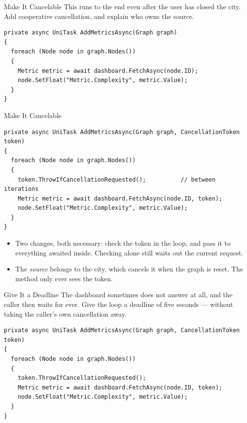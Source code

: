 \begin{exerciseframe}{Make It Cancelable}
  This runs to the end even after the user has closed the city. Add
  cooperative cancellation, and explain who owns the source.
  \vspace{1ex}

  \begin{lstlisting}[basicstyle=\scriptsize\ttfamily]
private async UniTask AddMetricsAsync(Graph graph)
{
  foreach (Node node in graph.Nodes())
  {
    Metric metric = await dashboard.FetchAsync(node.ID);
    node.SetFloat("Metric.Complexity", metric.Value);
  }
}
  \end{lstlisting}
\end{exerciseframe}

\begin{solutionframe}{Make It Cancelable}
  \begin{lstlisting}[basicstyle=\scriptsize\ttfamily]
private async UniTask AddMetricsAsync(Graph graph, CancellationToken token)
{
  foreach (Node node in graph.Nodes())
  {
    token.ThrowIfCancellationRequested();          // between iterations
    Metric metric = await dashboard.FetchAsync(node.ID, token);
    node.SetFloat("Metric.Complexity", metric.Value);
  }
}
  \end{lstlisting}
  \vspace{1ex}

  \begin{itemize}
    \item Two changes, both necessary: check the token in the loop, and pass
      it to everything awaited inside. Checking alone still waits out the
      current request.
    \item The \emph{source} belongs to the city, which cancels it when the
      graph is reset. The method only ever sees the token.
  \end{itemize}
  \vspace{1ex}

\end{solutionframe}

\begin{exerciseframe}{Give It a Deadline}
  The dashboard sometimes does not answer at all, and the caller then waits for
  ever. Give the loop a deadline of five seconds --- without taking the
  caller's own cancellation away.
  \vspace{1ex}

  \begin{lstlisting}[basicstyle=\scriptsize\ttfamily]
private async UniTask AddMetricsAsync(Graph graph, CancellationToken token)
{
  foreach (Node node in graph.Nodes())
  {
    token.ThrowIfCancellationRequested();
    Metric metric = await dashboard.FetchAsync(node.ID, token);
    node.SetFloat("Metric.Complexity", metric.Value);
  }
}
  \end{lstlisting}
\end{exerciseframe}

